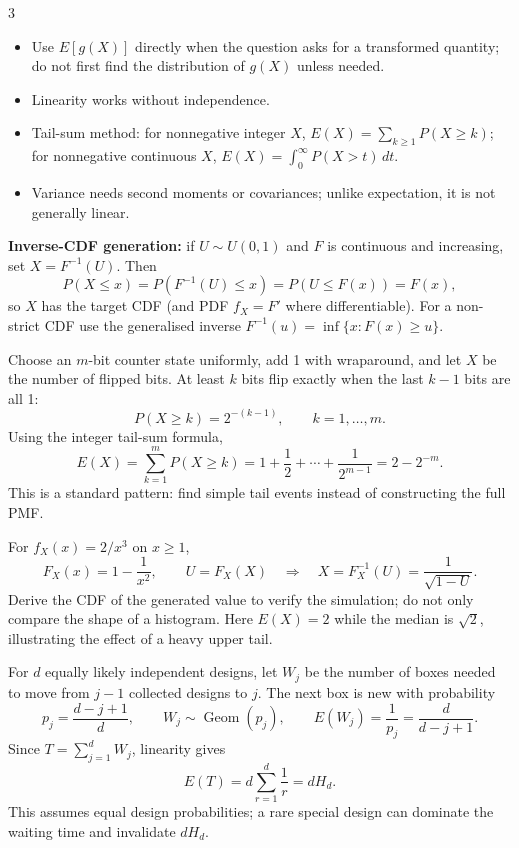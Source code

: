 \documentclass[10pt]{article}
\newcommand{\boxstart}[1]{\begin{tcolorbox}[title={#1},sharp corners]}
\newcommand{\boxend}{\end{tcolorbox}}
\begin{document}
\begin{multicols*}{3}
	\boxstart{L3 — Expectation tricks}
	\begin{itemize}
		\item Use $E[g(X)]$ directly when the question asks for a transformed quantity; do not first find the distribution of $g(X)$ unless needed.
		\item Linearity works without independence.
		\item Tail-sum method: for nonnegative integer $X$, $E(X)=\sum_{k\ge1}P(X\ge k)$; for nonnegative continuous $X$, $E(X)=\int_0^\infty P(X>t)\,dt$.
		\item Variance needs second moments or covariances; unlike expectation, it is not generally linear.
	\end{itemize}
	\textbf{Inverse-CDF generation:} if $U\sim U(0,1)$ and $F$ is continuous and increasing, set $X=F^{-1}(U)$. Then
	\[
		P(X\le x)=P(F^{-1}(U)\le x)=P(U\le F(x))=F(x),
	\]
	so $X$ has the target CDF (and PDF $f_X=F'$ where differentiable). For a non-strict CDF use the generalised inverse $F^{-1}(u)=\inf\{x:F(x)\ge u\}$.
	\boxend

	\boxstart{L3 — Finite binary counter: tail-sum method}
	Choose an $m$-bit counter state uniformly, add 1 with wraparound, and let $X$ be the number of flipped bits. At least $k$ bits flip exactly when the last $k-1$ bits are all 1:
	\[
		P(X\ge k)=2^{-(k-1)},\qquad k=1,\ldots,m.
	\]
	Using the integer tail-sum formula,
	\[
		E(X)=\sum_{k=1}^mP(X\ge k)
		=1+\frac12+\cdots+\frac1{2^{m-1}}
		=2-2^{-m}.
	\]
	This is a standard pattern: find simple tail events instead of constructing the full PMF.
	\boxend

	\boxstart{L3 — Inverse-CDF example: Pareto}
	For $f_X(x)=2/x^3$ on $x\ge1$,
	\[
		F_X(x)=1-\frac1{x^2},\qquad U=F_X(X)
		\quad\Longrightarrow\quad
		X=F_X^{-1}(U)=\frac1{\sqrt{1-U}}.
	\]
	Derive the CDF of the generated value to verify the simulation; do not only compare the shape of a histogram. Here $E(X)=2$ while the median is $\sqrt2$, illustrating the effect of a heavy upper tail.
	\boxend

	\boxstart{L3 — Complete collection / coupon collector}
	For $d$ equally likely independent designs, let $W_j$ be the number of boxes needed to move from $j-1$ collected designs to $j$. The next box is new with probability
	\[
		p_j=\frac{d-j+1}{d},\qquad W_j\sim\operatorname{Geom}(p_j),
		\qquad E(W_j)=\frac1{p_j}=\frac d{d-j+1}.
	\]
	Since $T=\sum_{j=1}^dW_j$, linearity gives
	\[
		E(T)=d\sum_{r=1}^d\frac1r=dH_d.
	\]
	This assumes equal design probabilities; a rare special design can dominate the waiting time and invalidate $dH_d$.
	\boxend


\end{multicols*}
\end{document}
